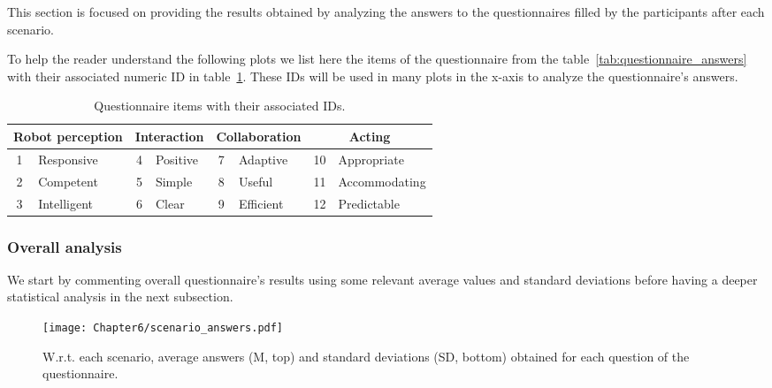This section is focused on providing the results obtained by analyzing the answers to the questionnaires filled by the participants after each scenario.

To help the reader understand the following plots we list here the items of the questionnaire from the table~\ref{tab:questionnaire_answers} with their associated numeric ID in table~\ref{tab:items_id}. These IDs will be used in many plots in the x-axis to analyze the questionnaire's answers.

\begin{table}[h]
    \center
    \begin{tabular}{|cl|cl|cl|cl|}
    \hline
    \multicolumn{2}{|c|}{\textbf{Robot perception}} & \multicolumn{2}{c|}{\textbf{Interaction}} & \multicolumn{2}{c|}{\textbf{Collaboration}} & \multicolumn{2}{c|}{\textbf{Acting}} \\ \hline
    1                 & Responsive                  & 4                & Positive               & 7                & Adaptive                 & 10          & Appropriate            \\ \hline
    2                 & Competent                   & 5                & Simple                 & 8                & Useful                   & 11          & Accommodating          \\ \hline
    3                 & Intelligent                 & 6                & Clear                  & 9                & Efficient                & 12          & Predictable            \\ \hline
    \end{tabular}
    \caption{Questionnaire items with their associated IDs.}
    \label{tab:items_id}
    \end{table}


\subsubsection{Overall analysis}

We start by commenting overall questionnaire's results using some relevant average values and standard deviations before having a deeper statistical analysis in the next subsection.

\begin{figure}[h]
    \center
    \texttt{[image: Chapter6/scenario\_answers.pdf]}
    \caption{W.r.t. each scenario, average answers (M, top) and standard deviations (SD, bottom) obtained for each question of the questionnaire.}
    \label{fig:scenario_answers}
\end{figure}

